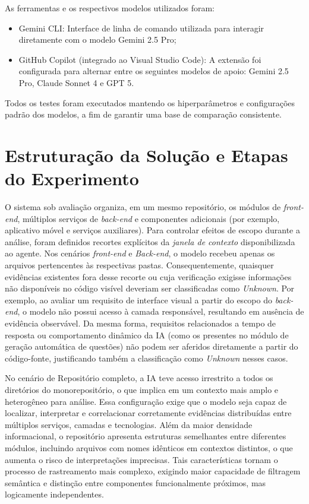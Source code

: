 As ferramentas e os respectivos modelos utilizados foram:

\begin{itemize}
    \item Gemini CLI: Interface de linha de comando utilizada para interagir diretamente com o modelo Gemini 2.5 Pro;
    \item GitHub Copilot (integrado ao Visual Studio Code): A extensão foi configurada para alternar entre os seguintes modelos de apoio: Gemini 2.5 Pro, Claude Sonnet 4 e GPT 5.
\end{itemize}

Todos os testes foram executados mantendo os hiperparâmetros e configurações padrão dos modelos, a fim de garantir uma base de comparação consistente.


\section{Estruturação da Solução e Etapas do Experimento}
O sistema sob avaliação organiza, em um mesmo repositório, os módulos de \textit{front-end}, múltiplos serviços de \textit{back-end} e componentes adicionais (por exemplo, aplicativo móvel e serviços auxiliares). Para controlar efeitos de escopo durante a análise, foram definidos recortes explícitos da \textit{janela de contexto} disponibilizada ao agente. Nos cenários \textit{front-end} e \textit{Back-end}, o modelo recebeu apenas os arquivos pertencentes às respectivas pastas. Consequentemente, quaisquer evidências existentes fora desse recorte ou cuja verificação exigisse informações não disponíveis no código visível deveriam ser classificadas como \textit{Unknown}. Por exemplo, ao avaliar um requisito de interface visual a partir do escopo do \textit{back-end}, o modelo não possui acesso à camada responsável, resultando em ausência de evidência observável. Da mesma forma, requisitos relacionados a tempo de resposta ou comportamento dinâmico da IA (como os presentes no módulo de geração automática de questões) não podem ser aferidos diretamente a partir do código-fonte, justificando também a classificação como \textit{Unknown} nesses casos.

No cenário de Repositório completo, a IA teve acesso irrestrito a todos os diretórios do monorepositório, o que implica em um contexto mais amplo e heterogêneo para análise. Essa configuração exige que o modelo seja capaz de localizar, interpretar e correlacionar corretamente evidências distribuídas entre múltiplos serviços, camadas e tecnologias. Além da maior densidade informacional, o repositório apresenta estruturas semelhantes entre diferentes módulos, incluindo arquivos com nomes idênticos em contextos distintos, o que aumenta o risco de interpretações imprecisas. Tais características tornam o processo de rastreamento mais complexo, exigindo maior capacidade de filtragem semântica e distinção entre componentes funcionalmente próximos, mas logicamente independentes.

